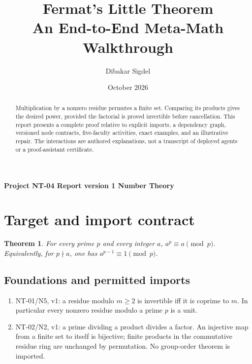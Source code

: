 \documentclass[preprint,12pt,aps,pra,showkeys,amsmath,amssymb,superscriptaddress,floatfix]{revtex4-2}
\newtheorem{theorem}{Theorem}[section]
\theoremstyle{definition}
\theoremstyle{remark}
\begin{document}
\title{Fermat's Little Theorem\\[4pt]\large An End-to-End Meta-Math Walkthrough}

\author{Dibakar Sigdel}


\date{October 2026}

\begin{abstract}

Multiplication by a nonzero residue permutes a finite set. Comparing its
products gives the desired power, provided the factorial is proved
invertible before cancellation. This report presents a complete proof
relative to explicit imports, a dependency graph, versioned node
contracts, five-faculty activities, exact examples, and an illustrative
repair. The interactions are authored explanations, not a transcript of
deployed agents or a proof-assistant certificate.

\end{abstract}

\maketitle

\linespread{1.12}\selectfont

\noindent\textbf{Project NT-04 \quad Report version 1 \quad Number Theory}

\section{Target and import contract}

\begin{theorem}

For every prime \(p\) and every integer \(a\), \(a^p\equiv a\pmod p\).
Equivalently, for \(p\nmid a\), one has \(a^{p-1}\equiv1\pmod p\).

\end{theorem}

\subsection{Foundations and permitted imports}

\begin{enumerate}
\def\labelenumi{\arabic{enumi}.}
\item
  NT-01/N5, v1: a residue modulo \(m\ge2\) is invertible iff it is
  coprime to \(m\). In particular every nonzero residue modulo a prime
  \(p\) is a unit.
\item
  NT-02/N2, v1: a prime dividing a product divides a factor. An
  injective map from a finite set to itself is bijective; finite
  products in the commutative residue ring are unchanged by permutation.
  No group-order theorem is imported.
\end{enumerate}
\end{document}
